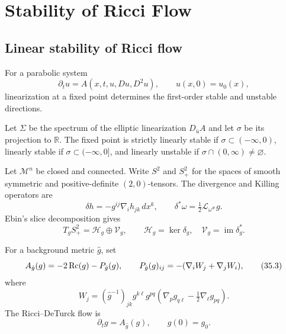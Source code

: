 \chapter[35]{Stability of Ricci Flow}
\label{ch:chow-iv-stability-ricci-flow}

\section{Linear stability of Ricci flow}

For a parabolic system
\begin{equation*}
 \partial_tu=A(x,t,u,Du,D^2u),\qquad u(x,0)=u_0(x),
 \tag{35.1}
\end{equation*}
linearization at a fixed point determines the first-order stable and unstable
directions.

\begin{definition}
\label{def:chow-iv-linear-stability}

Let $\Sigma$ be the spectrum of the elliptic linearization
$D_{\bar u}A$ and let $\sigma$ be its projection to $\mathbb R$.  The fixed
point is strictly linearly stable if $\sigma\subset(-\infty,0)$, linearly
stable if $\sigma\subset(-\infty,0]$, and linearly unstable if
$\sigma\cap(0,\infty)\ne\varnothing$.
\end{definition}

Let $\mathcal M^n$ be closed and connected.  Write $S^2$ and $S^2_+$ for the
spaces of smooth symmetric and positive-definite $(2,0)$-tensors.  The
divergence and Killing operators are
\[
 \delta h=-g^{ij}\nabla_i h_{jk}\,dx^k,
 \qquad \delta^*\omega=\tfrac12\mathcal L_{\omega^\#}g.
\]
Ebin's slice decomposition gives
\begin{equation*}
 T_gS^2_+=\mathcal H_g\oplus\mathcal V_g,
 \qquad \mathcal H_g=\ker\delta_g,\quad
 \mathcal V_g=\operatorname{im}\delta_g^*.
 \tag{35.2}
\end{equation*}

For a background metric $\hat g$, set
\begin{equation*}
 A_{\hat g}(g)=-2\operatorname{Rc}(g)-P_{\hat g}(g),
 \qquad P_{\hat g}(g)_{ij}=-(\nabla_iW_j+\nabla_jW_i),
 \tag{35.3}
\end{equation*}
where
\[
 W_j=(\hat g^{-1})_{jk}g^{k\ell}g^{pq}
 \left(\nabla_pg_{q\ell}-\tfrac12\nabla_\ell g_{pq}\right).
\]
The Ricci--DeTurck flow is
\begin{equation*}
 \partial_tg=A_{\hat g}(g),\qquad g(0)=g_0.
 \tag{35.5}
\end{equation*}

